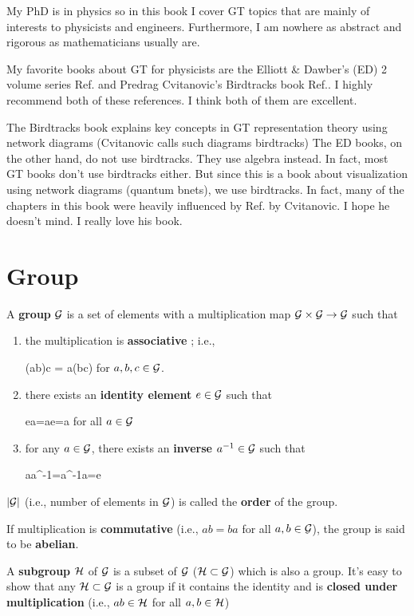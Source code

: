 My PhD is in physics
so in this book I cover 
GT topics that are  mainly of interests to
physicists and engineers. Furthermore,
I am nowhere as abstract and
rigorous as mathematicians 
usually are.

My favorite books about GT 
for physicists are the Elliott \& Dawber's (ED)
2 volume series Ref. \cite{eli-daw-book}
and Predrag Cvitanovic's Birdtracks book
Ref.\cite{birdtracks-book}. I highly
recommend both of these references. I think
both of them are excellent.

The Birdtracks book explains key 
concepts in GT representation theory
using network diagrams 
(Cvitanovic calls 
such diagrams birdtracks) The ED books, on the other hand, do not use birdtracks. They use algebra instead. In fact, most GT books don't use birdtracks either. 
But since this is a book
about visualization using network diagrams (quantum 
bnets), we use birdtracks.
In fact, many
of the chapters in this
book were heavily influenced 
by Ref.\cite{birdtracks-book}
by Cvitanovic. I hope he doesn't mind. I really love his  book.

\section{Group}

A {\bf group}
${\cal G}$
is a set of elements
with a multiplication map ${\cal G}\times {\cal G}
\rightarrow {\cal G}$
such that


\begin{enumerate}
\item 
the multiplication is {\bf associative
}; i.e., 

\beq
(ab)c = a(bc)
\eeq
for $a,b,c\in{\cal G}$.

\item
there exists an {\bf identity element}
$e\in {\cal G}$
such that 

\beq
ea=ae=a
\eeq
for all $a\in {\cal G}$

\item
for any $a\in{\cal G}$,
there exists an {\bf inverse} $a^{-1}\in {\cal G}$ such that

\beq
aa^{-1}=a^{-1}a=e
\eeq
\end{enumerate}

$|{\cal G}|$ (i.e., number of
elements in ${\cal G}$)
is called the {\bf order}
of the group.

If multiplication is
{\bf commutative}
(i.e., $ab=ba$ for all $a,b\in{\cal G}$),
the group is said to be {\bf abelian}.

A {\bf subgroup} ${\cal H}$ 
of ${\cal G}$
is a subset of ${\cal G}$
(${\cal H} \subset {\cal G}$)
which is also a group.
It's easy to show that any ${\cal H}\subset {\cal G}$ is a group if it
contains the identity
and is {\bf closed 
under multiplication} (i.e., $ab\in {\cal H}$ for all $a,b\in {\cal H}$) 



